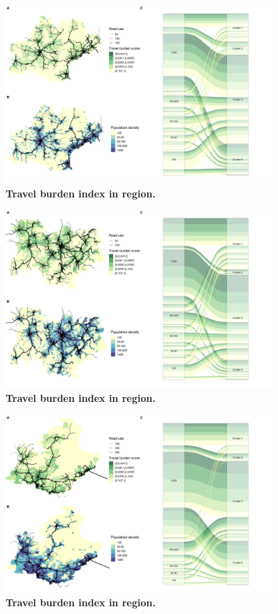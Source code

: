 \begin{figure}[H]
    \includegraphics[width=0.9\textwidth]{images/routes/fig4_76.png}
    \centering
    \caption{
        \textbf{Travel burden index in region.}
    }
\end{figure}

\begin{figure}[H]
    \includegraphics[width=0.9\textwidth]{images/routes/fig4_84.png}
    \centering
    \caption{
        \textbf{Travel burden index in region.}
    }
\end{figure}

\begin{figure}[H]
    \includegraphics[width=0.9\textwidth]{images/routes/fig4_93.png}
    \centering
    \caption{
        \textbf{Travel burden index in region.}
    }
\end{figure}

